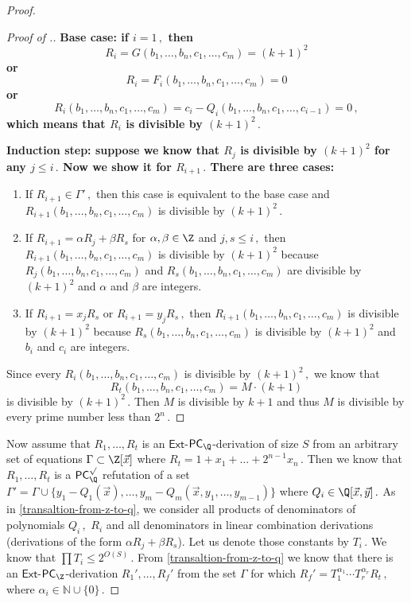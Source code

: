 \documentclass{toc}
\begin{document}
\begin{proof}
\begin{proof}[Proof of .]
\bfseries Base case: \mdseries if %
$i = 1\,,$ %
 then
$$
R_i = G(b_1, \ldots, b_n, c_1, \ldots, c_m) = (k + 1)^2 
$$
or
$$
R_i = F_i(b_1, \ldots, b_n,  c_1, \ldots, c_m) = 0
$$
or
$$
%
R_i(b_1, \ldots, b_n, c_1, \ldots, c_m) = c_i - Q_i(b_1, \ldots, b_n, c_1, \ldots, c_{i - 1}) = 0\,, %
$$
which means that $R_i$ is divisible by %
$(k + 1)^2\,.$ %

\bfseries Induction step: \mdseries suppose we know that $R_j$ is divisible by $(k + 1)^2$ for any %
$j \le i\,.$ %
 Now we show it for %
$R_{i + 1}\,.$ %
 There are three cases:
\begin{enumerate}
    \item If %
$R_{i + 1} \in \Gamma'\,,$ %
 then this case is equivalent to the base case and $R_{i + 1}(b_1, \ldots, b_n, c_1, \ldots, c_m)$ is divisible by %
$(k + 1)^2\,.$ %
    \item If $R_{i + 1} = \alpha R_j + \beta R_s$ for $\alpha, \beta \in \Z$ and %
$j, s \le i\,,$ %
 then
    $R_{i + 1}(b_1, \ldots, b_n, c_1, \ldots, c_m)$ is divisible by $(k + 1)^2$ because $R_j(b_1, \ldots, b_n, c_1, \ldots, c_m)$ and $R_s(b_1, \ldots, b_n, c_1, \ldots, c_m)$ are divisible by $(k + 1)^2$ and $\alpha$ and $\beta$ are integers.
    \item If $R_{i + 1} = x_j R_s$ or %
$R_{i + 1} = y_j R_s\,,$ %
 then $R_{i + 1}(b_1, \ldots, b_n, c_1, \ldots, c_m)$ is divisible by $(k + 1)^2$ because $R_s(b_1, \ldots, b_n, c_1, \ldots, c_m)$ is divisible by $(k + 1)^2$ and $b_i$ and $c_i$ are integers.
\end{enumerate}
Since every $R_{i}(b_1, \ldots, b_n, c_1, \ldots, c_m)$ is divisible by %
$(k + 1)^2\,,$ %
we know that %
%
$$R_{t}(b_1, \ldots, b_n, c_1, \ldots, c_m) = M \cdot (k  + 1)$$   %
is divisible by %
$(k + 1)^2\,.$ %
 Then $M$ is divisible by $k + 1$ and thus $M$ is divisible by every
prime number less than %
$2^n\,.$ %
\end{proof}


%
Now assume that %
$R_1, \ldots, R_t$ %
 is an $\mathsf{Ext}$-$\mathsf{PC}_{\Q}$-derivation of size $S$ from an arbitrary set of equations $\Gamma \subset \Z[\vec x]$  where %
$R_t = 1 + x_1 + \ldots + 2^{n - 1}x_n\,.$ %
 Then we know that %
$R_1, \ldots, R_t$ %
 is a $\mathsf{PC}_{\Q}^{\surd}$ refutation of a set $\Gamma' = \Gamma \cup \{y_1 - Q_1(\vec x), \ldots, y_m - Q_m(\vec x, y_1, \ldots, y_{m - 1})\}$ where  %
$Q_i \in \Q[\vec x, \vec y]\,.$ %
 As in \autoref{transaltion-from-z-to-q}, we consider all products of denominators of polynomials %
$Q_i\,,$ %
 $R_i$ and all denominators in linear combination derivations (derivations of the form $\alpha R_j + \beta R_s$). Let us denote those constants by %
$T_i\,.$ %
 We know that %
$\prod T_i \le 2^{O(S)}\,.$ %
 From  \autoref{transaltion-from-z-to-q} we know that there is an $\mathsf{Ext}$-$\mathsf{PC}_{\Z}$-derivation %
$R_1', \ldots, R_f'$ %
 from the set $\Gamma$ for which %
$R_f' = T_1^{\alpha_1} \cdots T_r^{\alpha_r} R_t\,,$ %
 where %
$\alpha_i \in \mathbb{N} \cup \{0\}\,.$ %
%


\end{proof}
\end{document}
